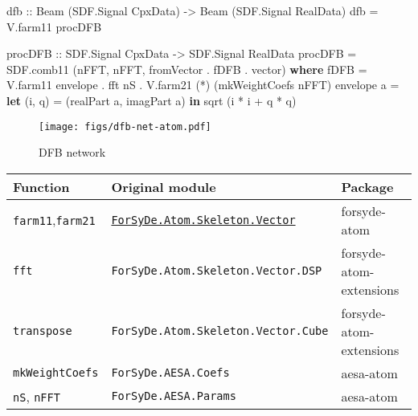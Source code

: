 \documentclass[
  a4paper,
]{article}
\newenvironment{Shaded}{}{}
\newcommand{\DataTypeTok}[1]{\textcolor[rgb]{0.56,0.13,0.00}{#1}}
\newcommand{\FunctionTok}[1]{\textcolor[rgb]{0.02,0.16,0.49}{#1}}
\newcommand{\KeywordTok}[1]{\textcolor[rgb]{0.00,0.44,0.13}{\textbf{#1}}}
\newcommand{\NormalTok}[1]{#1}
\newcommand{\OtherTok}[1]{\textcolor[rgb]{0.00,0.44,0.13}{#1}}
\begin{document}
\begin{Shaded}
\begin{Highlighting}[numbers=left,,firstnumber=342,]
\OtherTok{dfb ::} \DataTypeTok{Beam}\NormalTok{ (}\DataTypeTok{SDF.Signal} \DataTypeTok{CpxData}\NormalTok{)}
    \OtherTok{->} \DataTypeTok{Beam}\NormalTok{ (}\DataTypeTok{SDF.Signal} \DataTypeTok{RealData}\NormalTok{)}
\NormalTok{dfb }\FunctionTok{=}\NormalTok{ V.farm11 procDFB}

\OtherTok{procDFB ::} \DataTypeTok{SDF.Signal} \DataTypeTok{CpxData} \OtherTok{->} \DataTypeTok{SDF.Signal} \DataTypeTok{RealData}
\NormalTok{procDFB }\FunctionTok{=}\NormalTok{ SDF.comb11 (nFFT, nFFT, fromVector }\FunctionTok{.}\NormalTok{ fDFB }\FunctionTok{.}\NormalTok{ vector)}
  \KeywordTok{where}
\NormalTok{    fDFB       }\FunctionTok{=}\NormalTok{ V.farm11 envelope }\FunctionTok{.}\NormalTok{ fft nS }\FunctionTok{.}\NormalTok{ V.farm21 (}\FunctionTok{*}\NormalTok{) (mkWeightCoefs nFFT)}
\NormalTok{    envelope a }\FunctionTok{=} \KeywordTok{let}\NormalTok{ (i, q) }\FunctionTok{=}\NormalTok{ (realPart a, imagPart a)}
                 \KeywordTok{in} \FunctionTok{sqrt}\NormalTok{ (i }\FunctionTok{*}\NormalTok{ i }\FunctionTok{+}\NormalTok{ q }\FunctionTok{*}\NormalTok{ q)}
\end{Highlighting}
\end{Shaded}

\begin{figure}
\hypertarget{fig:dfb-net-atom}{%
\centering
\texttt{[image: figs/dfb-net-atom.pdf]}
\caption{DFB network}\label{fig:dfb-net-atom}
}
\end{figure}

\begin{longtable}[]{@{}lll@{}}
\toprule
Function & Original module & Package\tabularnewline
\midrule
\endhead
\texttt{farm11},\texttt{farm21} &
\href{https://forsyde.github.io/forsyde-atom/api/ForSyDe-Atom-Skeleton-Vector.html}{\texttt{ForSyDe.Atom.Skeleton.Vector}}
& forsyde-atom\tabularnewline
\texttt{fft} & \texttt{ForSyDe.Atom.Skeleton.Vector.DSP} &
forsyde-atom-extensions\tabularnewline
\texttt{transpose} & \texttt{ForSyDe.Atom.Skeleton.Vector.Cube} &
forsyde-atom-extensions\tabularnewline
\texttt{mkWeightCoefs} & \texttt{ForSyDe.AESA.Coefs} &
aesa-atom\tabularnewline
\texttt{nS}, \texttt{nFFT} & \texttt{ForSyDe.AESA.Params} &
aesa-atom\tabularnewline
\bottomrule
\end{longtable}
\end{document}

